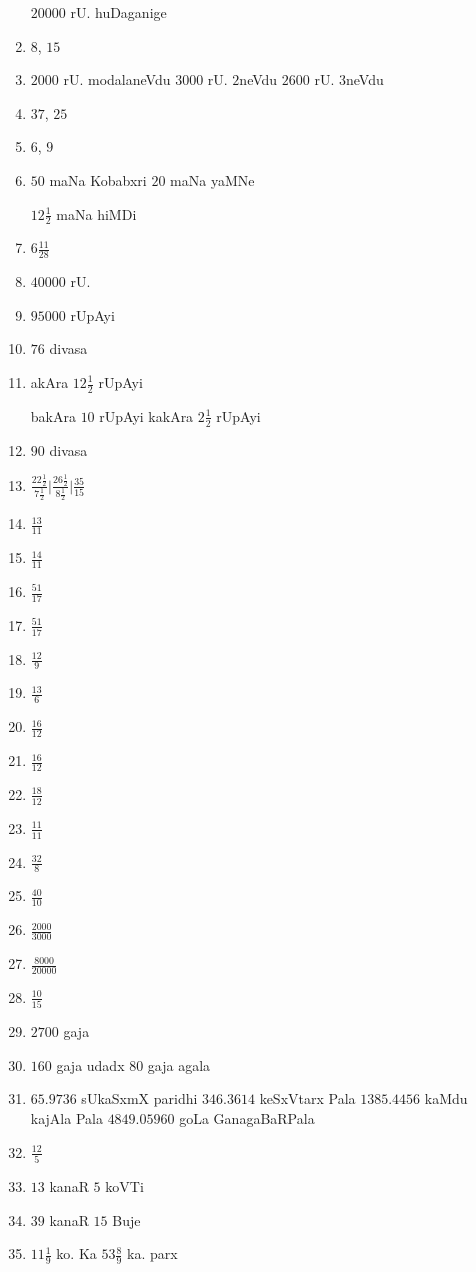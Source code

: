 \begin{multicols}{2}
\begin{enumerate}[$(1)$]
      $20000$ rU. huDaganige
\item $8$, $15$
\item $2000$ rU. modalaneVdu $3000$ rU. $2$neVdu $2600$ rU. $3$neVdu
\item $37$, $25$
\item $6$, $9$
\item $50$ maNa Kobabxri $20$ maNa yaMNe 

      $12\frac{1}{2}$ maNa hiMDi 
\item $6\frac{11}{28}$ 
\item $40000$ rU.
\item $95000$ rUpAyi
\item $76$ divasa
\item akAra  $12\frac{1}{2}$ rUpAyi 

      bakAra $10$ rUpAyi kakAra $2\frac{1}{2}$ rUpAyi
\item $90$ divasa
\item $\frac{22\frac{1}{2}}{7\frac{1}{2}} \bigg| 
\frac{26\frac{1}{2}}{8\frac{1}{2}}\bigg| \frac{35}{15}$
\item $\frac{13}{11}$
\item $\frac{14}{11}$
\item $\frac{51}{17}$
\item $\frac{51}{17}$
\item $\frac{12}{9}$
\item $\frac{13}{6}$
\item $\frac{16}{12}$
\item $\frac{16}{12}$
\item $\frac{18}{12}$
\item $\frac{11}{11}$
\item $\frac{32}{8}$
\item $\frac{40}{10}$
\item $\frac{2000}{3000}$
\item $\frac{8000}{20000}$
\item $\frac{10}{15}$
\item $2700$ gaja
\item $160$ gaja udadx $80$ gaja agala
\item $65.9736$ sUkaSxmX paridhi $346.3614$ keSxVtarx Pala $1385.4456$
kaMdu kajAla Pala $4849.05960$ goLa GanagaBaRPala
\item $\frac{12}{5}$
\item $13$ kanaR $5$ koVTi
\item $39$ kanaR $15$ Buje
\item $11\frac{1}{9}$ ko. Ka $53\frac{8}{9}$ ka. parx

\end{enumerate}
\end{multicols}
